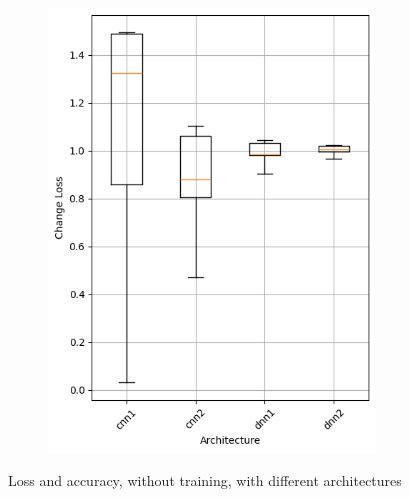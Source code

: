 \begin{figure}
\begin{subfigure}{0.5\textwidth}
        \centering
        \includegraphics[width=0.95\textwidth]{plots/Architecture_NotTrained_loss.png}
    \end{subfigure}
    \caption{Loss and accuracy, without training, with different architectures}
    \label{fig:architecture-notraining}
\end{figure}
